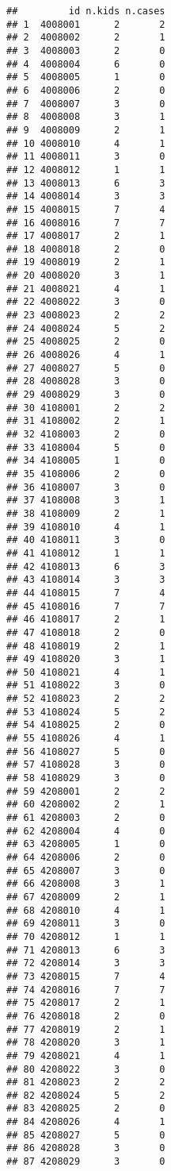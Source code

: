 \documentclass[
  12pt,
  a4paper]{book}
\begin{document}
\begin{verbatim}
##         id n.kids n.cases
## 1  4008001      2       2
## 2  4008002      2       1
## 3  4008003      2       0
## 4  4008004      6       0
## 5  4008005      1       0
## 6  4008006      2       0
## 7  4008007      3       0
## 8  4008008      3       1
## 9  4008009      2       1
## 10 4008010      4       1
## 11 4008011      3       0
## 12 4008012      1       1
## 13 4008013      6       3
## 14 4008014      3       3
## 15 4008015      7       4
## 16 4008016      7       7
## 17 4008017      2       1
## 18 4008018      2       0
## 19 4008019      2       1
## 20 4008020      3       1
## 21 4008021      4       1
## 22 4008022      3       0
## 23 4008023      2       2
## 24 4008024      5       2
## 25 4008025      2       0
## 26 4008026      4       1
## 27 4008027      5       0
## 28 4008028      3       0
## 29 4008029      3       0
## 30 4108001      2       2
## 31 4108002      2       1
## 32 4108003      2       0
## 33 4108004      5       0
## 34 4108005      1       0
## 35 4108006      2       0
## 36 4108007      3       0
## 37 4108008      3       1
## 38 4108009      2       1
## 39 4108010      4       1
## 40 4108011      3       0
## 41 4108012      1       1
## 42 4108013      6       3
## 43 4108014      3       3
## 44 4108015      7       4
## 45 4108016      7       7
## 46 4108017      2       1
## 47 4108018      2       0
## 48 4108019      2       1
## 49 4108020      3       1
## 50 4108021      4       1
## 51 4108022      3       0
## 52 4108023      2       2
## 53 4108024      5       2
## 54 4108025      2       0
## 55 4108026      4       1
## 56 4108027      5       0
## 57 4108028      3       0
## 58 4108029      3       0
## 59 4208001      2       2
## 60 4208002      2       1
## 61 4208003      2       0
## 62 4208004      4       0
## 63 4208005      1       0
## 64 4208006      2       0
## 65 4208007      3       0
## 66 4208008      3       1
## 67 4208009      2       1
## 68 4208010      4       1
## 69 4208011      3       0
## 70 4208012      1       1
## 71 4208013      6       3
## 72 4208014      3       3
## 73 4208015      7       4
## 74 4208016      7       7
## 75 4208017      2       1
## 76 4208018      2       0
## 77 4208019      2       1
## 78 4208020      3       1
## 79 4208021      4       1
## 80 4208022      3       0
## 81 4208023      2       2
## 82 4208024      5       2
## 83 4208025      2       0
## 84 4208026      4       1
## 85 4208027      5       0
## 86 4208028      3       0
## 87 4208029      3       0
\end{verbatim}
\end{document}
